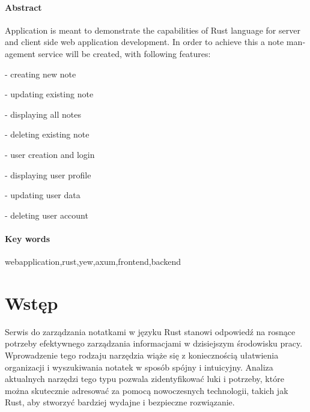 \documentclass[a4paper,twoside,12pt]{book}
\newcounter{stronyPozaNumeracja}
\begin{document}
\subsubsection*{Abstract} 
\begin{otherlanguage}{british}
Application is meant to demonstrate the capabilities of Rust language for server
and client side web application development. In order to achieve this a note
management service will be created, with following features:

- creating new note

- updating existing note

- displaying all notes

- deleting existing note

- user creation and login

- displaying user profile

- updating user data

- deleting user account


\end{otherlanguage}
\subsubsection*{Key words}  
\begin{otherlanguage}{british}
webapplication,rust,yew,axum,frontend,backend
\end{otherlanguage}




\tableofcontents

\setcounter{stronyPozaNumeracja}{\value{page}}
\mainmatter
\pagestyle{empty}

\cleardoublepage

\pagestyle{NumeryStronNazwyRozdzialow}


\chapter{Wstęp}
\label{ch:wstep}

Serwis do zarządzania notatkami w języku Rust stanowi odpowiedź na rosnące potrzeby efektywnego zarządzania informacjami w dzisiejszym środowisku pracy. Wprowadzenie tego rodzaju narzędzia wiąże się z koniecznością ułatwienia organizacji i wyszukiwania notatek w sposób spójny i intuicyjny. Analiza aktualnych narzędzi tego typu pozwala zidentyfikować luki i potrzeby, które można skutecznie adresować za pomocą nowoczesnych technologii, takich jak Rust, aby stworzyć bardziej wydajne i bezpieczne rozwiązanie.
\end{document}
